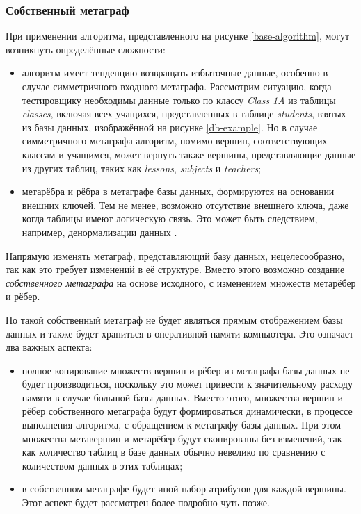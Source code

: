 \subsubsection{Собственный метаграф}

При применении алгоритма, представленного на рисунке \ref{base-algorithm}, могут возникнуть определённые сложности:

\begin{itemize}
  \item алгоритм имеет тенденцию возвращать избыточные данные, особенно в случае симметричного входного метаграфа. Рассмотрим ситуацию, когда тестировщику необходимы данные только по классу \textit{Class 1A} из таблицы \textit{classes}, включая всех учащихся, представленных в таблице \textit{students}, взятых из базы данных, изображённой на рисунке \ref{db-example}. Но в случае симметричного метаграфа алгоритм, помимо вершин, соответствующих классам и учащимся, может вернуть также вершины, представляющие данные из других таблиц, таких как \textit{lessons}, \textit{subjects} и \textit{teachers};
  \item метарёбра и рёбра в метаграфе базы данных, формируются на основании внешних ключей. Тем не менее, возможно отсутствие внешнего ключа, даже когда таблицы имеют логическую связь. Это может быть следствием, например, денормализации данных \cite{denormalization}.
\end{itemize}

Напрямую изменять метаграф, представляющий базу данных, нецелесообразно, так как это требует изменений в её структуре. Вместо этого возможно создание \textit{собственного метаграфа} на основе исходного, с изменением множеств метарёбер и рёбер.

Но такой собственный метаграф не будет являться прямым отображением базы данных и также будет храниться в оперативной памяти компьютера. Это означает два важных аспекта:

\begin{itemize}
  \item полное копирование множеств вершин и рёбер из метаграфа базы данных не будет производиться, поскольку это может привести к значительному расходу памяти в случае большой базы данных. Вместо этого, множества вершин и рёбер собственного метаграфа будут формироваться динамически, в процессе выполнения алгоритма, с обращением к метаграфу базы данных. При этом множества метавершин и метарёбер будут скопированы без изменений, так как количество таблиц в базе данных обычно невелико по сравнению с количеством данных в этих таблицах;
  \item в собственном метаграфе будет иной набор атрибутов для каждой вершины. Этот аспект будет рассмотрен более подробно чуть позже.
\end{itemize}

